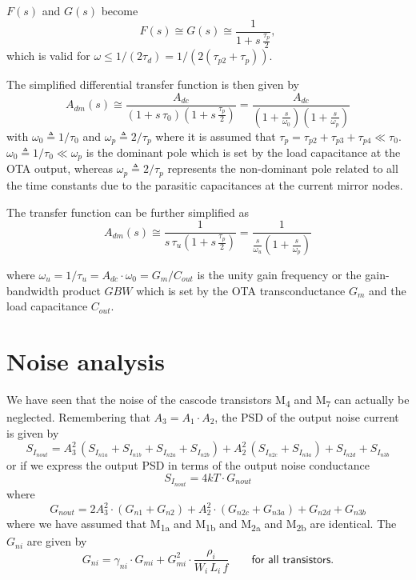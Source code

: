 \documentclass[
  a4paper,
  DIV=11,
  numbers=noendperiod]{scrreprt}
\begin{document}
\(F(s)\) and \(G(s)\) become \begin{equation}
  F(s) \cong G(s) \cong \frac{1}{1+s\,\frac{\tau_p}{2}},
\end{equation} which is valid for
\(\omega \leq 1/(2 \tau_d) =1/(2(\tau_{p2}+\tau_p))\).

The simplified differential transfer function is then given by
\begin{equation}
  A_{dm}(s) \cong \frac{A_{dc}}{\left(1+s\,\tau_0\right)\left(1+s\,\frac{\tau_p}{2}\right)} = \frac{A_{dc}}{\left(1+\frac{s}{\omega_0}\right)\left(1+\frac{s}{\omega_p}\right)}
\end{equation} with \(\omega_0 \triangleq 1/\tau_0\) and
\(\omega_p \triangleq 2/\tau_p\) where it is assumed that
\(\tau_p = \tau_{p2}+\tau_{p3}+\tau_{p4} \ll \tau_0\).
\(\omega_0 \triangleq 1/\tau_0 \ll \omega_p\) is the dominant pole which
is set by the load capacitance at the OTA output, whereas
\(\omega_p \triangleq 2/\tau_p\) represents the non-dominant pole
related to all the time constants due to the parasitic capacitances at
the current mirror nodes.

The transfer function can be further simplified as \begin{equation}
  A_{dm}(s) \cong \frac{1}{s\,\tau_u\left(1+s\,\frac{\tau_p}{2}\right)} = \frac{1}{\frac{s}{\omega_u}\left(1+\frac{s}{\omega_p}\right)}
\end{equation}

where \(\omega_u = 1/\tau_u = A_{dc} \cdot \omega_0 = G_m/C_{out}\) is
the unity gain frequency or the gain-bandwidth product \(GBW\) which is
set by the OTA transconductance \(G_m\) and the load capacitance
\(C_{out}\).

\section{Noise analysis}\label{noise-analysis}

We have seen that the noise of the cascode transistors
M\textsubscript{4} and M\textsubscript{7} can actually be neglected.
Remembering that \(A_3=A_1 \cdot A_2\), the PSD of the output noise
current is given by \begin{equation}
  S_{I_{nout}} = A_3^2\,\left(S_{I_{n1a}}+S_{I_{n1b}}+S_{I_{n2a}}+S_{I_{n2b}}\right) + A_2^2\,\left(S_{I_{n2c}}+S_{I_{n3a}}\right)+S_{I_{n2d}}+S_{I_{n3b}}
\end{equation} or if we express the output PSD in terms of the output
noise conductance \begin{equation}
  S_{I_{nout}} =4 kT \cdot G_{nout}
\end{equation} where \begin{equation}
  G_{nout} = 2 A_3^2 \cdot (G_{n1}+G_{n2}) + A_2^2 \cdot (G_{n2c}+G_{n3a}) + G_{n2d} + G_{n3b}
\end{equation} where we have assumed that M\textsubscript{1a} and
M\textsubscript{1b} and M\textsubscript{2a} and M\textsubscript{2b} are
identical. The \(G_{ni}\) are given by \begin{equation}
  G_{ni} = \gamma_{ni} \cdot G_{mi} + G_{mi}^2 \cdot \frac{\rho_i}{W_i\,L_i\,f} \qquad \textsf{for all transistors}.
\end{equation}
\end{document}
